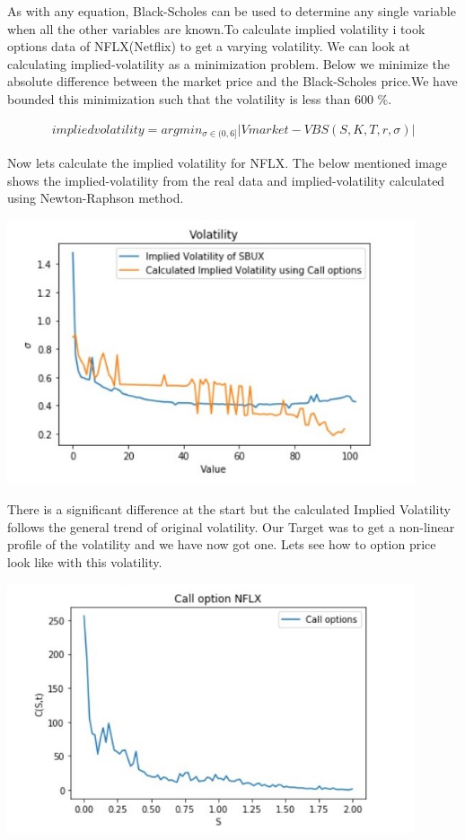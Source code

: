 \documentclass[12pt]{article}
\begin{document}
 As with any equation, Black-Scholes can be used to determine any single variable when all the other variables are known.To calculate implied volatility i took options data of NFLX(Netflix) to get a varying volatility. We can look at calculating implied-volatility as a minimization problem. Below we minimize the absolute difference between the market price and the Black-Scholes price.We have bounded this minimization such that the volatility is less than 600 \%.
 
 
\begin{align}
	implied volatility=argmin_{\sigma \in(0,6]} |Vmarket  - VBS(S,K,T,r,\sigma)|
\end{align}

Now lets calculate the implied volatility for NFLX. The below mentioned image shows the implied-volatility from the real data and implied-volatility calculated using Newton-Raphson method. \cite{bworld}

\includegraphics[width=12cm]{p6}

There is a significant difference at the start but the calculated Implied Volatility follows the general trend of original volatility. Our Target was to get a non-linear profile of the volatility and we have now got one. Lets see how to option price look like with this volatility. 

\includegraphics[width=12cm]{p7}
\end{document}
